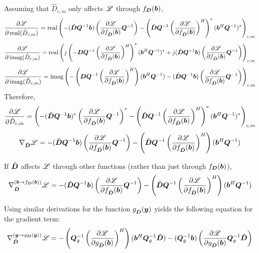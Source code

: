 \begin{appendices}
Assuming that $\hat{D}_{c,m}$ only affects $\mathscr{L}$ through $f_{\bm{D}}(\bm{b})$,
\begin{equation}
\frac{\partial \mathscr{L}}{\partial \operatorname{real}(\hat{D}_{c,m})} = \operatorname{real}\left(-(\hat{\bm{D}}\bm{Q}^{-1}\bm{b})\left(\frac{\partial \mathscr{L}}{\partial f_{\hat{\bm{D}}}(\bm{b})}\bm{Q}^{-1}\right) - \left(\hat{\bm{D}}\bm{Q}^{-1}\left(\frac{\partial \mathscr{L}}{\partial f_{\hat{\bm{D}}}(\bm{b})}\right)^H\right)^* (\bm{b}^H\bm{Q}^{-1})^*\right)_{c,m}
\end{equation}
\begin{equation}
\frac{\partial \mathscr{L}}{\partial \operatorname{imag}(\hat{D}_{c,m})} = \operatorname{real}\left(j\left(-\bm{D}\bm{Q}^{-1}\left(\frac{\partial \mathscr{L}}{\partial f_{\hat{\bm{D}}}(\bm{b})}\right)^H\right)^*(\bm{b}^H\bm{Q}^{-1})^* + j(\hat{\bm{D}}\bm{Q}^{-1}\bm{b})\left(\frac{\partial \mathscr{L}}{\partial f_{\hat{\bm{D}}}(\bm{b})}\bm{Q}^{-1}\right)\right)_{c,m}
\end{equation}
\begin{equation}
\frac{\partial \mathscr{L}}{\partial \operatorname{imag}(\hat{D}_{c,m})} = \operatorname{imag}\left(-\left(\bm{D}\bm{Q}^{-1}\left(\frac{\partial \mathscr{L}}{\partial f_{\hat{\bm{D}}}(\bm{b})}\right)^H\right)(\bm{b}^H\bm{Q}^{-1}) - (\hat{\bm{D}}\bm{Q}^{-1}\bm{b})\left(\frac{\partial \mathscr{L}}{\partial f_{\hat{\bm{D}}}(\bm{b})}\bm{Q}^{-1}\right)\right)_{c,m}
\end{equation}
Therefore,
\begin{equation}
\frac{\partial \mathscr{L}}{\partial \hat{D}_{c,m}} = \left(-(\hat{\bm{D}}\bm{Q}^{-1}\bm{b})^*\left(\frac{\partial \mathscr{L}}{\partial f_{\hat{\bm{D}}}(\bm{b})}\bm{Q}^{-1}\right)^* - \left(\hat{\bm{D}}\bm{Q}^{-1}\left(\frac{\partial \mathscr{L}}{\partial f_{\hat{\bm{D}}}(\bm{b})}\right)^H\right)^* (\bm{b}^H\bm{Q}^{-1})^*\right)_{c,m}
\end{equation}
\begin{equation}
\nabla_{\hat{\bm{D}}} \mathscr{L} = -(\hat{\bm{D}}\bm{Q}^{-1}\bm{b})\left(\frac{\partial \mathscr{L}}{\partial f_{\hat{\bm{D}}}(\bm{b})}\bm{Q}^{-1}\right) - \left(\hat{\bm{D}}\bm{Q}^{-1}\left(\frac{\partial \mathscr{L}}{\partial f_{\hat{\bm{D}}}(\bm{b})}\right)^H\right) (\bm{b}^H\bm{Q}^{-1})
\end{equation}

If $\hat{\bm{D}}$ affects $\mathscr{L}$ through other functions (rather than just through $f_{\bm{D}}(\bm{b})$),
\begin{equation}
\nabla^{(\bm{b} \rightarrow f_{\bm{D}}(\bm{b}))}_{\hat{\bm{D}}} \mathscr{L} = -(\hat{\bm{D}}\bm{Q}^{-1}\bm{b})\left(\frac{\partial \mathscr{L}}{\partial f_{\hat{\bm{D}}}(\bm{b})}\bm{Q}^{-1}\right) - \left(\hat{\bm{D}}\bm{Q}^{-1}\left(\frac{\partial \mathscr{L}}{\partial f_{\hat{\bm{D}}}(\bm{b})}\right)^H\right) (\bm{b}^H\bm{Q}^{-1})
\end{equation}


Using similar derivations for the function $g_{\hat{\bm{D}}}(\bm{y})$ yields the following equation for the gradient term:
\begin{equation}
\nabla^{(\bm{y} \rightarrow g_{\bm{D}}(\bm{y}))}_{\hat{\bm{D}}} \mathscr{L} = -\left(\bm{Q}_g^{-1}\left(\frac{\partial \mathscr{L}}{\partial g_{\hat{\bm{D}}}(\bm{b})}\right)^H\right)(\bm{b}^H\bm{Q}_g^{-1}\hat{\bm{D}}) - (\bm{Q}_g^{-1}\bm{b})\left(\frac{\partial \mathscr{L}}{\partial g_{\hat{\bm{D}}}(\bm{b})}\bm{Q}_g^{-1}\hat{\bm{D}}\right)
\end{equation}



\end{appendices}

